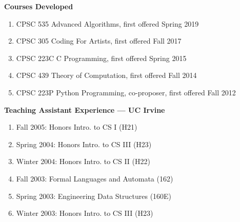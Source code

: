 \documentclass[11pt]{letter}
\newcommand{\comment}[1]{}
\begin{document}
\comment{
\begin{enumerate}
\item CPSC 120 Introduction to Programming: Fall 2019, Fall 2018, Fall 2012,  Spring 2012, Fall 2011, Spring 2011, Fall 2010, Spring 2010, Fall 2009
\item CPSC 131 Data Structures Concepts: Fall 2016, Spring 2016, Fall 2015, Spring 2013, Fall 2013
\item CPSC 223C C Programming: Spring 2015
\item CPSC 254 Unix and Open Source Software: Spring 2011, Spring 2010
\item CPSC 305 Coding for Artists: Fall 2018, Fall 2017
\item CPSC 335 Algorithm Engineering: Summer 2019, Spring 2019, Fall 2018, Summer 2018, Spring 2018, Fall 2017, Summer 2015, Spring 2015, Fall 2014, Summer 2014, Spring 2014, Summer 2013, Spring 2013, Summer 2012, Spring 2012, Summer 2011, Spring 2011, Summer 2010, Spring 2010, Fall 2009
\item CPSC 433 Data Security and Encryption: Summer 2012
\item CPSC 439 Theory of Computation: Fall 2016, Fall 2015, Fall 2014, Spring 2012
\item CPSC 452 Cryptography: Summer 2017, Summer 2012
\item CPSC 481 Artificial Intelligence: Fall 2013
\item CPSC 484 Principles of Computer Graphics: Spring 2019, Spring 2018, Spring 2016
\item CPSC 535 Advanced Algorithms: Fall 2019, Spring 2019
\item CPSC 597 Graduate Project: Fall 2011
\end{enumerate}
}

\textbf{Courses Developed}
\begin{enumerate}
\item CPSC 535 Advanced Algorithms, first offered Spring 2019
\item CPSC 305 Coding For Artists, first offered Fall 2017
\item CPSC 223C C Programming, first offered Spring 2015
\item CPSC 439 Theory of Computation, first offered Fall 2014
\item CPSC 223P Python Programming, co-proposer, first offered Fall 2012
\end{enumerate}

\textbf{Teaching Assistant Experience --- UC Irvine}
\begin{enumerate}
\item Fall 2005: Honors Intro. to CS I (H21)
\item Spring 2004: Honors Intro. to CS III (H23)
\item Winter 2004: Honors Intro. to CS II (H22)
\item Fall 2003: Formal Languages and Automata (162)
\item Spring 2003: Engineering Data Structures (160E)
\item Winter 2003: Honors Intro. to CS III (H23)
\end{enumerate}
\end{document}
